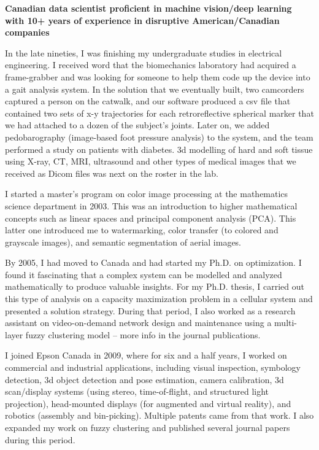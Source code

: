 \onehalfspace
\textbf{\large Canadian data scientist proficient in machine vision/deep learning with 10+ years of experience in disruptive American/Canadian companies}
\singlespace

\vspace{0.8cm}

In the late nineties, I was finishing my undergraduate studies in electrical engineering. I received word that the biomechanics laboratory had acquired a frame-grabber and was looking for someone to help them code up the device into a gait analysis system. In the solution that we eventually built, two camcorders captured a person on the catwalk, and our software produced a csv file that contained two sets of x-y trajectories for each retroreflective spherical marker that we had attached to a dozen of the subject’s joints. Later on, we added pedobarography (image-based foot pressure analysis) to the system, and the team performed a study on patients with diabetes. 3d modelling of hard and soft tissue using X-ray, CT, MRI, ultrasound and other types of medical images that we received as Dicom files was next on the roster in the lab.

\newcommand{\osspacing}{\vspace{0.5cm}}

\osspacing
I started a master’s program on color image processing at the mathematics science department in 2003. This was an introduction to higher mathematical concepts such as linear spaces and principal component analysis (PCA). This latter one introduced me to watermarking, color transfer (to colored and grayscale images), and semantic segmentation of aerial images.

\osspacing
By 2005, I had moved to Canada and had started my Ph.D. on optimization. I found it fascinating that a complex system can be modelled and analyzed mathematically to produce valuable insights. For my Ph.D. thesis, I carried out this type of analysis on a capacity maximization problem in a cellular system and presented a solution strategy. During that period, I also worked as a research assistant on video-on-demand network design and maintenance using a multi-layer fuzzy clustering model – more info in the journal publications.

\osspacing
I joined Epson Canada in 2009, where for six and a half years, I worked on commercial and industrial applications, including visual inspection, symbology detection, 3d object detection and pose estimation, camera calibration, 3d scan/display systems (using stereo, time-of-flight, and structured light projection), head-mounted displays (for augmented and virtual reality), and robotics (assembly and bin-picking). Multiple patents came from that work. I also expanded my work on fuzzy clustering and published several journal papers during this period.			

